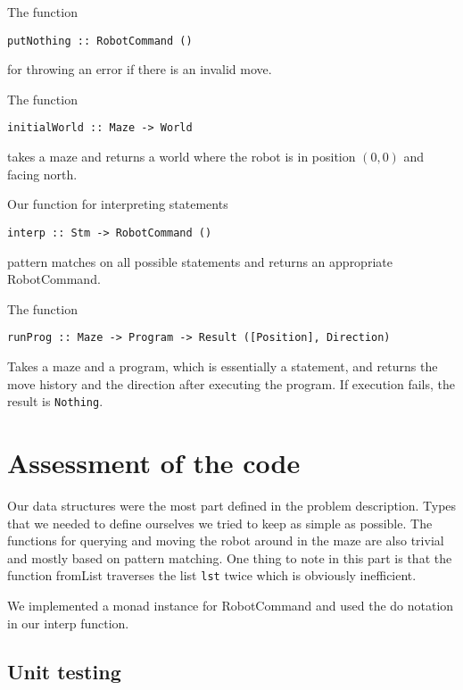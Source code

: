 \documentclass[a4paper,10pt]{article}
\begin{document}
The function
\begin{verbatim}
putNothing :: RobotCommand ()
\end{verbatim}
for throwing an error if there is an invalid move.

The function
\begin{verbatim}
initialWorld :: Maze -> World
\end{verbatim}
takes a maze and returns a world where the robot is in position $(0,0)$ and facing north. 

Our function for interpreting statements
\begin{verbatim}
interp :: Stm -> RobotCommand ()
\end{verbatim}
pattern matches on all possible statements and returns an appropriate RobotCommand.

The function 
\begin{verbatim}
runProg :: Maze -> Program -> Result ([Position], Direction)
\end{verbatim}
Takes a maze and a program, which is essentially a statement, and returns the move history and the direction after executing the program. If execution fails, the result is \verb=Nothing=.

\section{Assessment of the code}

Our data structures were the most part defined in the problem description. Types that we needed to define ourselves we tried to keep as simple as possible. The functions for querying and moving the robot around in the maze are also trivial and mostly based on pattern matching. One thing to note in this part is that the function fromList traverses the list \verb=lst= twice which is obviously inefficient.

We implemented a monad instance for RobotCommand and used the do notation in our interp function.

\subsection{Unit testing}
\end{document}
